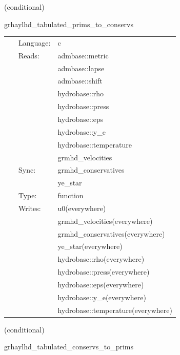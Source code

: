 \documentclass{article}
\begin{document}
\vspace{5mm}

   (conditional) 

\hspace{5mm} grhaylhd\_tabulated\_prims\_to\_conservs 

\hspace{5mm}{\it tabulated version of grhaylhd\_prims\_to\_conservs } 


\hspace{5mm}

 \begin{tabular*}{160mm}{cll} 
~ & Language:  & c \\ 
~ & Reads:  & admbase::metric \\ 
~& ~ &admbase::lapse\\ 
~& ~ &admbase::shift\\ 
~& ~ &hydrobase::rho\\ 
~& ~ &hydrobase::press\\ 
~& ~ &hydrobase::eps\\ 
~& ~ &hydrobase::y\_e\\ 
~& ~ &hydrobase::temperature\\ 
~& ~ &grmhd\_velocities\\ 
~ & Sync:  & grmhd\_conservatives \\ 
~& ~ &ye\_star\\ 
~ & Type:  & function \\ 
~ & Writes:  & u0(everywhere) \\ 
~& ~ &grmhd\_velocities(everywhere)\\ 
~& ~ &grmhd\_conservatives(everywhere)\\ 
~& ~ &ye\_star(everywhere)\\ 
~& ~ &hydrobase::rho(everywhere)\\ 
~& ~ &hydrobase::press(everywhere)\\ 
~& ~ &hydrobase::eps(everywhere)\\ 
~& ~ &hydrobase::y\_e(everywhere)\\ 
~& ~ &hydrobase::temperature(everywhere)\\ 
\end{tabular*} 


\vspace{5mm}

   (conditional) 

\hspace{5mm} grhaylhd\_tabulated\_conservs\_to\_prims 
\end{document}
